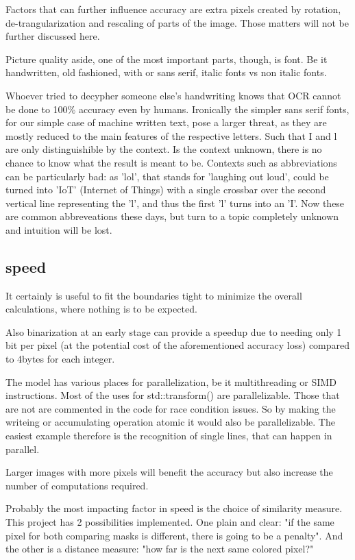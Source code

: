 \documentclass[12pt]{scrartcl}
\begin{document}
Factors that can further influence accuracy are extra pixels created by rotation, de-trangularization and rescaling of parts of the image. Those matters will not be further discussed here.

Picture quality aside, one of the most important parts, though, is font. Be it handwritten, old fashioned, with or sans serif, italic fonts vs non italic fonts.

Whoever tried to decypher someone else's handwriting knows that OCR cannot be done to 100\% accuracy even by humans. Ironically the simpler sans serif fonts, for our simple case of machine written text, pose a larger threat, as they are mostly reduced to the main features of the respective letters. Such that I and l are only distinguishible by the context. Is the context unknown, there is no chance to know what the result is meant to be. Contexts such as abbreviations can be particularly bad: as 'lol', that stands for 'laughing out loud', could be turned into 'IoT' (Internet of Things) with a single crossbar over the second vertical line representing the 'l', and thus the first 'l' turns into an 'I'. Now these are common abbreveations these days, but turn to a topic completely unknown and intuition will be lost.


\subsection {speed}
It certainly is useful to fit the boundaries tight to minimize the overall calculations, where nothing is to be expected.

Also binarization at an early stage can provide a speedup due to needing only 1 bit per pixel (at the potential cost of the aforementioned accuracy loss) compared to 4bytes for each integer.

The model has various places for parallelization, be it multithreading or SIMD instructions. Most of the uses for std::transform() are parallelizable. Those that are not are commented in the code for race condition issues. So by making the writeing or accumulating operation atomic it would also be parallelizable. The easiest example therefore is the recognition of single lines, that can happen in parallel.

Larger images with more pixels will benefit the accuracy but also increase the number of computations required.

Probably the most impacting factor in speed is the choice of similarity measure. This project has 2 possibilities implemented. One plain and clear: "if the same pixel for both comparing masks is different, there is going to be a penalty". And the other is a distance measure: "how far is the next same colored pixel?"
\end{document}
